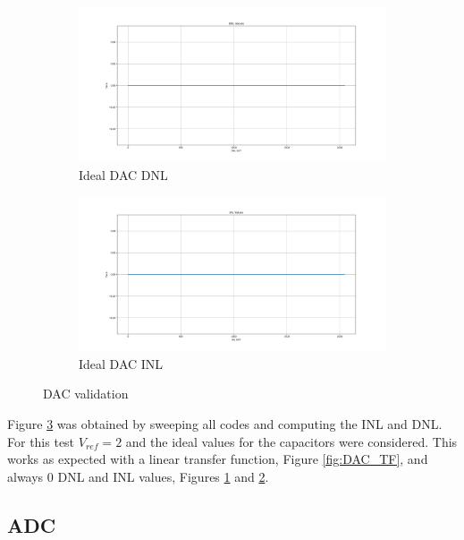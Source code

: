 \begin{figure}[h]
    \begin{subfigure}[b]{0.5\textwidth}
        \centering
        \includegraphics[width=\textwidth]{Images/DAC_DNL_ideal.png}
        \caption{Ideal DAC DNL}
        \label{fig:DAC_DNL}
    \end{subfigure}%
    \begin{subfigure}[b]{0.5\textwidth}
        \centering
        \includegraphics[width=\textwidth]{Images/DAC_INL_ideal.png}
        \caption{Ideal DAC INL}
        \label{fig:DAC_INL}
    \end{subfigure}

    \caption{DAC validation}
    \label{fig:IdealDAC}
\end{figure}

Figure \ref{fig:IdealDAC} was obtained by sweeping all codes and computing the INL and DNL. For this test $V_{ref} = 2$ and the ideal values for the capacitors were considered. This works as expected with a linear transfer function, Figure \ref{fig:DAC_TF}, and always 0 DNL and INL values, Figures \ref{fig:DAC_DNL} and \ref{fig:DAC_INL}.

\subsection{ADC}

